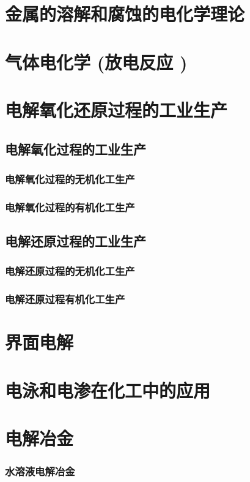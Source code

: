 \documentclass[UTF8]{../03-Chemistry}
\begin{document}
\section{金属的溶解和腐蚀的电化学理论}
\section{气体电化学 (放电反应 )}

\section{电解氧化还原过程的工业生产}
\subsection{电解氧化过程的工业生产}
    \subsubsection{电解氧化过程的无机化工生产}
    \subsubsection{电解氧化过程的有机化工生产}
\subsection{电解还原过程的工业生产}
    \subsubsection{电解还原过程的无机化工生产}
    \subsubsection{电解还原过程有机化工生产}

\section{界面电解}
\section{电泳和电渗在化工中的应用}
\section{电解冶金}
    \subsubsection{水溶液电解冶金}
\end{document}
